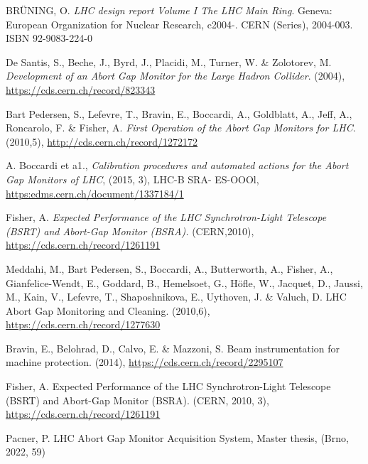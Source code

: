 %
{\printbibliography}{

    \begin{thebibliography}{99}
	
         BR\"UNING, O. \emph{LHC design report Volume I The LHC
            Main Ring}. Geneva: European Organization for Nuclear Research, c2004-. CERN
            (Series), 2004-003. ISBN 92-9083-224-0

        De Santis, S., Beche, J., Byrd, J., Placidi, M.,
            Turner, W. \& Zolotorev, M. \emph{Development of an Abort Gap Monitor for the
            Large Hadron Collider}.  (2004), \url{https://cds.cern.ch/record/823343}

        Bart Pedersen, S., Lefevre, T., Bravin, E., Boccardi, A.,
            Goldblatt, A., Jeff, A., Roncarolo, F. \& Fisher, A. \emph{First Operation of
            the Abort Gap Monitors for LHC}.  (2010,5), \url{http://cds.cern.ch/record/1272172}

         A. Boccardi et a1., \emph{Calibration procedures and
            automated actions for the Abort Gap Monitors of LHC}, (2015, 3), LHC-B SRA-
            ES-OOOl, \url{https:edms.cern.ch/document/1337184/1}

        Fisher, A. \emph{Expected Performance of the LHC
            Synchrotron-Light Telescope (BSRT) and Abort-Gap Monitor (BSRA).}
            (CERN,2010), \url{https://cds.cern.ch/record/1261191}

        Meddahi, M., Bart Pedersen, S., Boccardi, A.,
            Butterworth, A., Fisher, A., Gianfelice-Wendt, E., Goddard, B., Hemelsoet,
            G., Höfle, W., Jacquet, D., Jaussi, M., Kain, V., Lefevre, T., Shaposhnikova,
            E., Uythoven, J. \& Valuch, D. LHC Abort Gap Monitoring and Cleaning.
            (2010,6), \url{https://cds.cern.ch/record/1277630}

        Bravin, E., Belohrad, D., Calvo, E. \& Mazzoni, S. Beam
            instrumentation for machine protection.  (2014), \url{https://cds.cern.ch/record/2295107}

        Fisher, A. Expected Performance of the LHC
            Synchrotron-Light Telescope (BSRT) and Abort-Gap Monitor (BSRA).
            (CERN, 2010, 3), \url{https://cds.cern.ch/record/1261191}

        Pacner, P. LHC Abort Gap Monitor
            Acquisition System, Master thesis, (Brno, 2022, 59)



    \end{thebibliography}
} %
